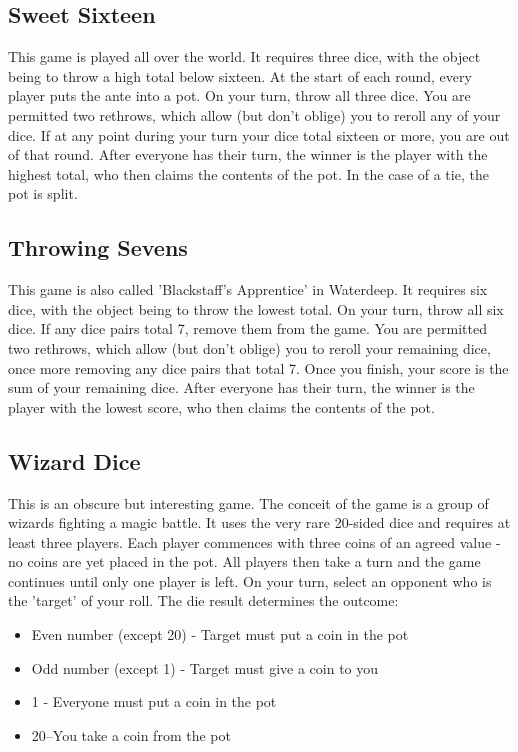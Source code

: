 \documentclass[10pt,a4paper,twoside,twocolumn,openany,bg=print,nodeprecatedcode]{dndbook}
\begin{document}
\subsection{Sweet Sixteen}
This game is played all over the world. It requires three dice, with the object being to throw a high total below sixteen. At the start of each round, every player puts the ante into a pot.
On your turn, throw all three dice. You are permitted two rethrows, which allow (but don't oblige) you to reroll any of your dice. If at any point during your turn your dice total sixteen or more, you are out of that round.
After everyone has their turn, the winner is the player with the highest total, who then claims the contents of the pot. In the case of a tie, the pot is split.
\subsection{Throwing Sevens}
This game is also called 'Blackstaff's Apprentice' in Waterdeep. It requires six dice, with the object being to throw the lowest total.
On your turn, throw all six dice. If any dice pairs total 7, remove them from the game. You are permitted two rethrows, which allow (but don't oblige) you to reroll your remaining dice, once more removing any dice pairs that total 7. Once you finish, your score is the sum of your remaining dice.
After everyone has their turn, the winner is the player with the lowest score, who then claims the contents of the pot.
\subsection{Wizard Dice}
This is an obscure but interesting game. The conceit of the game is a group of wizards fighting a magic battle. It uses the very rare 20-sided dice and requires at least three players.
Each player commences with three coins of an agreed value - no coins are yet placed in the pot. All players then take a turn and the game continues until only one player is left.
On your turn, select an opponent who is the 'target' of your roll. The die result determines the outcome:

\begin{itemize}
\item Even number (except 20) - Target must put a coin in the pot
\item Odd number (except 1) - Target must give a coin to you
\item 1 - Everyone must put a coin in the pot
\item 20–You take a coin from the pot
\end{itemize}
\end{document}
